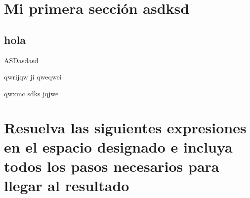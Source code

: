 \documentclass[10pt,spanish]{article}
\begin{document}
\newpage

\section{Mi primera sección asdksd}

\lipsum[1]

\subsection{hola}

\begin{alternatives}
  \item ASDasdasd
  \item qwrijqw ji qweqwei
  \item qwxmc sdks jqjwe
\end{alternatives}

\lipsum[1]




\section{Resuelva las siguientes expresiones en el espacio designado e %
incluya todos los pasos necesarios para llegar al resultado}

\lipsum[1]

\section{}

\lipsum[1]
\end{document}
